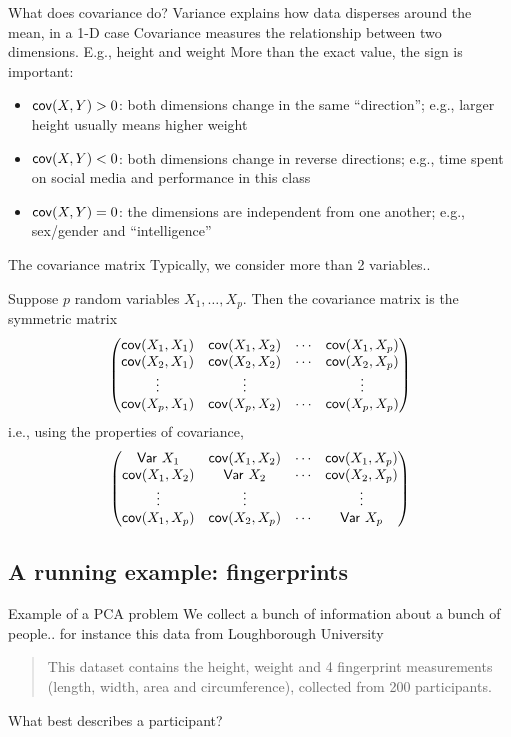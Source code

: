 \documentclass[aspectratio=169]{beamer}\usepackage[]{graphicx}\usepackage[]{xcolor}
\begin{document}
\begin{frame}{What does covariance do?}
Variance explains how data disperses around the mean, in a 1-D case
\vfill
Covariance measures the relationship between two dimensions. E.g., height and weight
\vfill
More than the exact value, the sign is important:
\begin{itemize}
    \item $\mathsf{cov}(X,Y)>0$: both dimensions change in the same ``direction''; e.g., larger height usually means higher weight
    \item $\mathsf{cov}(X,Y)<0$: both dimensions change in reverse directions; e.g., time spent on social media and performance in this class
    \item $\mathsf{cov}(X,Y)=0$: the dimensions are independent from one another; e.g., sex/gender and ``intelligence''
\end{itemize}
\end{frame}

\begin{frame}{The covariance matrix}
Typically, we consider more than 2 variables.. 
\begin{definition}
Suppose $p$ random variables $X_1,\ldots,X_p$. Then the covariance matrix is the symmetric matrix
\[
\begin{pmatrix}
\mathsf{cov}(X_1,X_1) & \mathsf{cov}(X_1,X_2) & \cdots & \mathsf{cov}(X_1,X_p) \\
\mathsf{cov}(X_2,X_1) & \mathsf{cov}(X_2,X_2) & \cdots & \mathsf{cov}(X_2,X_p) \\
\vdots & \vdots & & \vdots \\
\mathsf{cov}(X_p,X_1) & \mathsf{cov}(X_p,X_2) & \cdots & \mathsf{cov}(X_p,X_p) 
\end{pmatrix}
\]
i.e., using the properties of covariance,
\[
\begin{pmatrix}
\mathsf{Var}\  X_1 & \mathsf{cov}(X_1,X_2) & \cdots & \mathsf{cov}(X_1,X_p) \\
\mathsf{cov}(X_1,X_2) & \mathsf{Var}\  X_2 & \cdots & \mathsf{cov}(X_2,X_p) \\
\vdots & \vdots & & \vdots \\
\mathsf{cov}(X_1,X_p) & \mathsf{cov}(X_2,X_p) & \cdots & \mathsf{Var}\  X_p 
\end{pmatrix}
\]
\end{definition}
\end{frame}


\subsection{A running example: fingerprints}
\begin{frame}{Example of a PCA problem}
We collect a bunch of information about a bunch of people.. for instance this data from Loughborough University
\vfill
\begin{quote}
This dataset contains the height, weight and 4 fingerprint measurements (length, width, area and circumference), collected from 200 participants.
\end{quote}
\vfill
What best describes a participant?
\end{frame}
\end{document}
